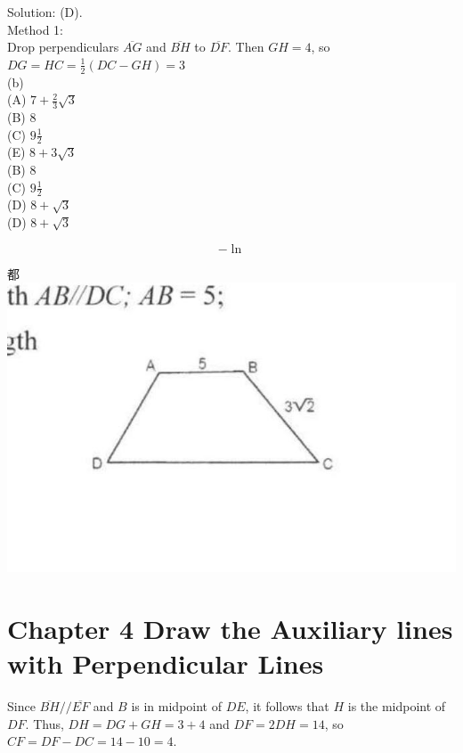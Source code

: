 \documentclass[10pt]{article}
\begin{document}
Solution: (D).\\
Method 1:\\
Drop perpendiculars \(\overline{A G}\) and \(\overline{B H}\) to \(\overline{D F}\). Then \(G H=4\), so \(D G=H C=\frac{1}{2}(D C-G H)=3\)\\
(b)\\
(A) \(7+\frac{2}{3} \sqrt{3}\)\\
(B) 8\\
(C) \(9 \frac{1}{2}\)\\
(E) \(8+3 \sqrt{3}\)\\
(B) 8\\
(C) \(9 \frac{1}{2}\)\\
(D) \(8+\sqrt{3}\)\\
(D) \(8+\sqrt{3}\)

\[
-\ln
\]

都\\
\includegraphics[max width=\textwidth, center]{2025_04_17_97bc1f7e44d93c271a88g-076}

\section*{Chapter 4 Draw the Auxiliary lines with Perpendicular Lines}
Since \(\overline{B H} / / \overline{E F}\) and \(B\) is in midpoint of \(D E\), it follows that \(H\) is the midpoint of \(D F\). Thus, \(D H=D G+G H=3+4\) and \(D F=2 D H=14\), so \(C F=D F-D C=14-10=4\).
\end{document}
